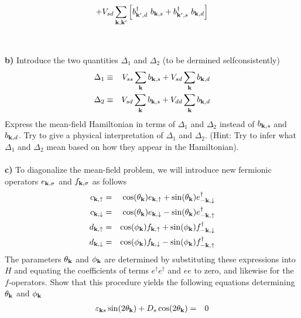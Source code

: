 \begin{problem}
\begin{eqnarray}
		+
		V_{sd}\sum_{{\bf k},{\bf k}^{\prime}}
		\left[ b^{\dagger}_{{\bf k}^{\prime},d}~b_{{\bf k},s} + b^{\dagger}_{{\bf k}^{\prime},s}~b_{{\bf k},d}  \right]  \nonumber
	\end{eqnarray}
	\ \\
	\ \\
	{\bf b)} Introduce the two quantities $\Delta_1$ and $\Delta_2$ (to be dermined selfconsistently)
	\begin{eqnarray}
		\Delta_1 & \equiv & V_{ss} \sum_{\bf k}b_{{\bf k},s} + V_{sd} \sum_{\bf k} b_{{\bf k},d} \nonumber \\
		\Delta_2 & \equiv & V_{sd} \sum_{\bf k}b_{{\bf k},s} + V_{dd} \sum_{\bf k} b_{{\bf k},d} \nonumber
	\end{eqnarray}
	Express the mean-field Hamiltonian in terms of $\Delta_1$ and $\Delta_2$ instead of $b_{{\bf k},s}$ and $b_{{\bf k},d}$. 
	Try to give  a physical interpretation of  $\Delta_1$ and $\Delta_2$. (Hint: Try to infer what $\Delta_1$ and $\Delta_2$ mean based on how they appear in the Hamiltonian). 
	\ \\
	\ \\
	{\bf c)} To diagonalize the mean-field problem, we will introduce new fermionic operators $e_{{\bf k},\sigma}$ and $f_{{\bf k},\sigma}$ as follows
	\begin{eqnarray}
		c_{{\bf k},\uparrow} & = & 
		\cos(\theta_{\bf k}) e_{{\bf k},\uparrow} +  \sin(\theta_{\bf k}) e^{\dagger}_{-{\bf k},\downarrow}  \nonumber \\
		c_{{\bf k},\downarrow} & = & 
		\cos(\theta_{\bf k}) e_{{\bf k},\downarrow} - \sin(\theta_{\bf k}) e^{\dagger}_{-{\bf k},\uparrow} \nonumber \\
		d_{{\bf k},\uparrow} & = & 
		\cos(\phi_{\bf k}) f_{{\bf k},\uparrow} +  \sin(\phi_{\bf k}) f^{\dagger}_{-{\bf k},\downarrow}  \nonumber \\
		d_{{\bf k},\downarrow} & = & 
		\cos(\phi_{\bf k}) f_{{\bf k},\downarrow} - \sin(\phi_{\bf k}) f^{\dagger}_{-{\bf k},\uparrow} \nonumber 
	\end{eqnarray}
	The parameters $\theta_{\bf k}$ and $\phi_{\bf k}$ are determined by substituting these expressions into $H$ and equating
	the coefficients of terms $e^{\dagger}e^{\dagger}  $ and $e e$ to zero, and likewise for the $f$-operators. Show that this procedure yields the following equations determining  $\theta_{\bf k}$ and $\phi_{\bf k}$
	\begin{eqnarray}
		\varepsilon_{{\bf k} s}  \sin(2 \theta_{\bf k}) +  D_s \cos(2 \theta_{\bf k})  & = & 0 \nonumber \\

\end{eqnarray}
\end{problem}
